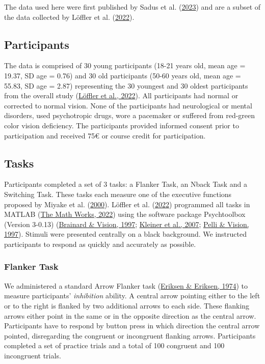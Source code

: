 \documentclass[
  man]{apa7}
\begin{document}
The data used here were first published by Sadus et al. (\protect\hyperlink{ref-sadus2023multiverse}{2023}) and are a subset of the data collected by Löffler et al. (\protect\hyperlink{ref-loffler2022common}{2022}).

\hypertarget{participants}{%
\subsection{Participants}\label{participants}}

The data is comprised of 30 young participants (18-21 years old, mean age = 19.37, SD age = 0.76) and 30 old participants (50-60 years old, mean age = 55.83, SD age = 2.87) representing the 30 youngest and 30 oldest participants from the overall study (\protect\hyperlink{ref-loffler2022common}{Löffler et al., 2022}). All participants had normal or corrected to normal vision. None of the participants had neurological or mental disorders, used psychotropic drugs, wore a pacemaker or suffered from red-green color vision deficiency. The participants provided informed consent prior to participation and received 75€ or course credit for participation.

\hypertarget{tasks}{%
\subsection{Tasks}\label{tasks}}

Participants completed a set of 3 tasks: a Flanker Task, an Nback Task and a Switching Task. These tasks each measure one of the executive functions proposed by Miyake et al. (\protect\hyperlink{ref-miyake2000unity}{2000}). Löffler et al. (\protect\hyperlink{ref-loffler2022common}{2022}) programmed all tasks in MATLAB (\protect\hyperlink{ref-matlab2022b}{The Math Works, 2022}) using the software package Psychtoolbox (Version 3-0.13) (\protect\hyperlink{ref-brainard1997psychophysics}{Brainard \& Vision, 1997}; \protect\hyperlink{ref-kleiner2007psychtoolbox}{Kleiner et al., 2007}; \protect\hyperlink{ref-pelli1997videotoolbox}{Pelli \& Vision, 1997}). Stimuli were presented centrally on a black background. We instructed participants to respond as quickly and accurately as possible.

\hypertarget{flanker-task}{%
\subsubsection{Flanker Task}\label{flanker-task}}

We administered a standard Arrow Flanker task (\protect\hyperlink{ref-eriksen1974effects}{Eriksen \& Eriksen, 1974}) to measure participants' \emph{inhibition} ability. A central arrow pointing either to the left or to the right is flanked by two additional arrows to each side. These flanking arrows either point in the same or in the opposite direction as the central arrow. Participants have to respond by button press in which direction the central arrow pointed, disregarding the congruent or incongruent flanking arrows. Participants completed a set of practice trials and a total of 100 congruent and 100 incongruent trials.
\end{document}

